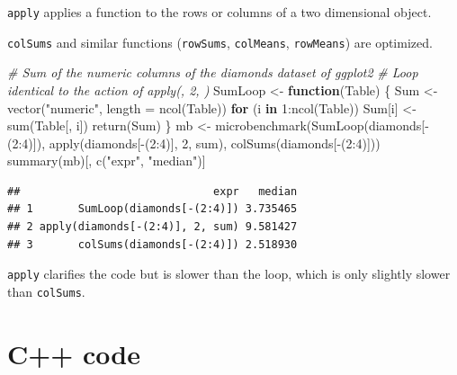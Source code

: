 \documentclass[
  12pt,
  american,
  a4paper,
  extrafontsizes,onecolumn,openright
  ]{memoir}
\newenvironment{Shaded}{\begin{snugshade}}{\end{snugshade}}
\newcommand{\AttributeTok}[1]{\textcolor[rgb]{0.77,0.63,0.00}{#1}}
\newcommand{\CommentTok}[1]{\textcolor[rgb]{0.56,0.35,0.01}{\textit{#1}}}
\newcommand{\ControlFlowTok}[1]{\textcolor[rgb]{0.13,0.29,0.53}{\textbf{#1}}}
\newcommand{\DecValTok}[1]{\textcolor[rgb]{0.00,0.00,0.81}{#1}}
\newcommand{\FunctionTok}[1]{\textcolor[rgb]{0.00,0.00,0.00}{#1}}
\newcommand{\NormalTok}[1]{#1}
\newcommand{\OtherTok}[1]{\textcolor[rgb]{0.56,0.35,0.01}{#1}}
\newcommand{\SpecialCharTok}[1]{\textcolor[rgb]{0.00,0.00,0.00}{#1}}
\newcommand{\StringTok}[1]{\textcolor[rgb]{0.31,0.60,0.02}{#1}}
\begin{document}
\texttt{apply} applies a function to the rows or columns of a two dimensional object.

\texttt{colSums} and similar functions (\texttt{rowSums}, \texttt{colMeans}, \texttt{rowMeans}) are optimized.

\scriptsize

\begin{Shaded}
\begin{Highlighting}[]
\CommentTok{\# Sum of the numeric columns of the diamonds dataset of ggplot2}
\CommentTok{\# Loop identical to the action of apply(, 2, )}
\NormalTok{SumLoop }\OtherTok{\textless{}{-}} \ControlFlowTok{function}\NormalTok{(Table) \{}
\NormalTok{  Sum }\OtherTok{\textless{}{-}} \FunctionTok{vector}\NormalTok{(}\StringTok{"numeric"}\NormalTok{, }\AttributeTok{length =} \FunctionTok{ncol}\NormalTok{(Table))}
  \ControlFlowTok{for}\NormalTok{ (i }\ControlFlowTok{in} \DecValTok{1}\SpecialCharTok{:}\FunctionTok{ncol}\NormalTok{(Table)) Sum[i] }\OtherTok{\textless{}{-}} \FunctionTok{sum}\NormalTok{(Table[, i])}
  \FunctionTok{return}\NormalTok{(Sum)}
\NormalTok{\}}
\NormalTok{mb }\OtherTok{\textless{}{-}} \FunctionTok{microbenchmark}\NormalTok{(}\FunctionTok{SumLoop}\NormalTok{(diamonds[}\SpecialCharTok{{-}}\NormalTok{(}\DecValTok{2}\SpecialCharTok{:}\DecValTok{4}\NormalTok{)]), }
                     \FunctionTok{apply}\NormalTok{(diamonds[}\SpecialCharTok{{-}}\NormalTok{(}\DecValTok{2}\SpecialCharTok{:}\DecValTok{4}\NormalTok{)], }\DecValTok{2}\NormalTok{, sum), }
                     \FunctionTok{colSums}\NormalTok{(diamonds[}\SpecialCharTok{{-}}\NormalTok{(}\DecValTok{2}\SpecialCharTok{:}\DecValTok{4}\NormalTok{)]))}
\FunctionTok{summary}\NormalTok{(mb)[, }\FunctionTok{c}\NormalTok{(}\StringTok{"expr"}\NormalTok{, }\StringTok{"median"}\NormalTok{)]}
\end{Highlighting}
\end{Shaded}

\begin{verbatim}
##                              expr   median
## 1       SumLoop(diamonds[-(2:4)]) 3.735465
## 2 apply(diamonds[-(2:4)], 2, sum) 9.581427
## 3       colSums(diamonds[-(2:4)]) 2.518930
\end{verbatim}

\normalsize

\texttt{apply} clarifies the code but is slower than the loop, which is only slightly slower than \texttt{colSums}.

\hypertarget{sec:cpp}{%
\section{C++ code}\label{sec:cpp}}
\end{document}
